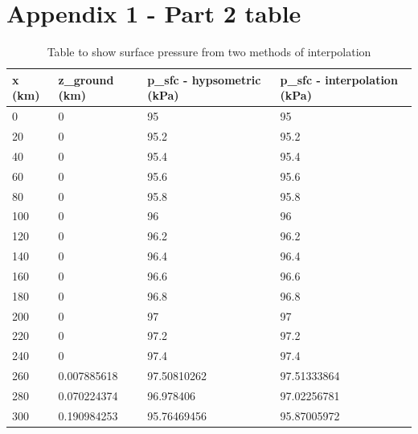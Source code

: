 \documentclass[12pt]{article}
\begin{document}
\newpage
\section*{Appendix 1 - Part 2 table}

\begin{longtable}{|l|l|l|l|}
\caption {Table to show surface pressure from two methods of interpolation} \\
    \hline
    \textbf{x (km)} & \textbf{z\_ground (km)} & \textbf{p\_sfc - hypsometric (kPa)} & \textbf{p\_sfc - interpolation (kPa)} \\ \hline
    \hline
    \endhead
    0    & 0           & 95                         & 95                      \\ \hline
    20   & 0           & 95.2                       & 95.2                    \\ \hline
    40   & 0           & 95.4                       & 95.4                    \\ \hline
    60   & 0           & 95.6                       & 95.6                    \\ \hline
    80   & 0           & 95.8                       & 95.8                    \\ \hline
    100  & 0           & 96                         & 96                      \\ \hline
    120  & 0           & 96.2                       & 96.2                    \\ \hline
    140  & 0           & 96.4                       & 96.4                    \\ \hline
    160  & 0           & 96.6                       & 96.6                    \\ \hline
    180  & 0           & 96.8                       & 96.8                    \\ \hline
    200  & 0           & 97                         & 97                      \\ \hline
    220  & 0           & 97.2                       & 97.2                    \\ \hline
    240  & 0           & 97.4                       & 97.4                    \\ \hline
    260  & 0.007885618 & 97.50810262                & 97.51333864             \\ \hline
    280  & 0.070224374 & 96.978406                  & 97.02256781             \\ \hline
    300  & 0.190984253 & 95.76469456                & 95.87005972             \\ \hline

\end{longtable}
\end{document}
